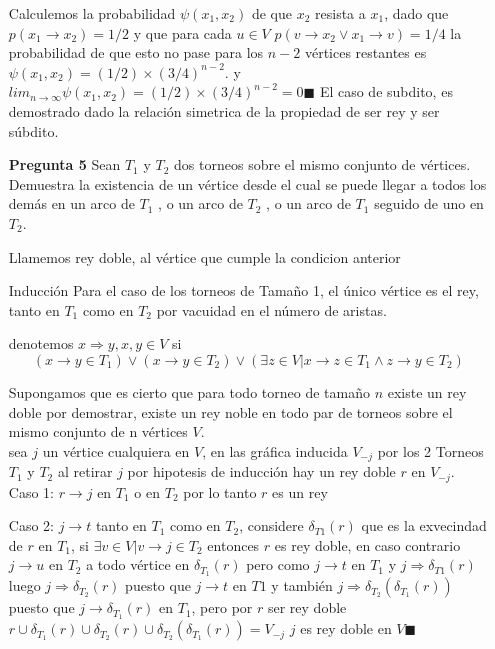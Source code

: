\documentclass[12pt]{article}
\begin{document}
\begin{itemize}
Calculemos la probabilidad $\psi(x_1,x_2)$ de que $x_2$ resista a $x_1$, dado que $p(x_1 \rightarrow x_2)=1/2$ y que para cada $u \in V$  $ p(v\rightarrow x_2 \vee x_1\rightarrow v )=1/4$ la probabilidad de que esto no pase para los $n-2$ vértices restantes es $\psi(x_1,x_2)=(1/2)\times(3/4)^{n-2}$.
y $lim_{n\to\infty} \psi(x_1,x_2)=(1/2)\times(3/4)^{n-2} = 0 \blacksquare$
El caso de subdito, es demostrado dado la relación simetrica de la propiedad de ser rey y ser súbdito.


\item[\bf{Pregunta 5}]Sean $T_{1}$ y $T_{2}$ dos torneos sobre el mismo conjunto de vértices. Demuestra la existencia de un vértice desde el cual se puede llegar a todos los demás en un arco de $T_{1}$ , o un arco de $T_{2}$ , o un arco de $T_{1}$ seguido de uno en $T_{2}$.

Llamemos rey doble, al vértice que cumple la condicion anterior\\

\item[Inducción] Para el caso de los torneos de Tamaño 1, el único vértice es el rey, tanto en $T_1$ como en $T_2$ por vacuidad en el número de aristas.

  denotemos $x \Rightarrow y , x,y \in V$ si $$(x \rightarrow y \in T_1) \vee (x \rightarrow y \in T_2) \vee (\exists z \in V | x \rightarrow z \in T_1 \wedge z \rightarrow y \in T_2)$$ 

  Supongamos que es cierto que para todo torneo de tamaño $n$ existe un rey doble
  por demostrar, existe un rey noble en todo par de torneos sobre el mismo conjunto de n vértices $V$.\\
  sea $j$ un vértice cualquiera en $V$, en las gráfica inducida $V_{-j}$ por los 2 Torneos $T_1$ y $T_2$ al retirar $j$ por hipotesis de inducción hay un rey doble $r$ en $V_{-j}$.\\
Caso 1: $r \rightarrow j $ en $T_1$ o en $T_2$  por lo tanto $r$ es un rey

Caso 2: $j \rightarrow t $ tanto en $T_1$ como en $T_2$, considere $\delta_{T1}(r)$ que 
es la exvecindad de $r$ en $T_1$, si $ \exists v \in V | v \rightarrow j  \in T_2 $ entonces $r$ es rey doble, en caso contrario  $j \rightarrow u $ en $T_2$ a todo 
vértice en $\delta_{T_1}(r)$ pero como $j \rightarrow t $ en $T_1 $  y
$ j \Rightarrow \delta_{T1}(r) $ luego $ j \Rightarrow \delta_{T_2}(r) $ puesto que 
$j \rightarrow t $ en $T1$ y también $ j \Rightarrow \delta_{T_2}(\delta_{T_1}(r))$ 
puesto que $j \rightarrow \delta_{T_1}(r) $ en $T_1$, pero por $r$ ser rey doble 
$r \cup \delta_{T_1}(r) \cup \delta_{T_2}(r) \cup \delta_{T_2}(\delta_{T_1}(r)) = V_{-j}$ $j$ es rey doble en $V \blacksquare$


\end{itemize}
\end{document}
